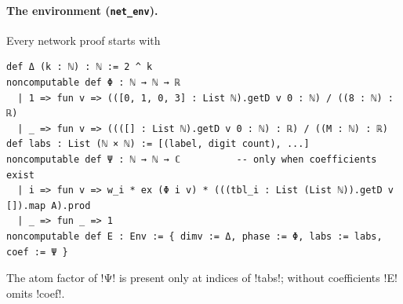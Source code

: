 {{{\paragraph{The environment (\texttt{net\_env}).} Every network proof starts with
\begin{lstlisting}[style=lexlean]
def Δ (k : ℕ) : ℕ := 2 ^ k
noncomputable def Φ : ℕ → ℕ → ℝ
  | 1 => fun v => (([0, 1, 0, 3] : List ℕ).getD v 0 : ℕ) / ((8 : ℕ) : ℝ)
  | _ => fun v => ((([] : List ℕ).getD v 0 : ℕ) : ℝ) / ((M : ℕ) : ℝ)
def labs : List (ℕ × ℕ) := [(label, digit count), ...]
noncomputable def Ψ : ℕ → ℕ → ℂ          -- only when coefficients exist
  | i => fun v => w_i * ex (Φ i v) * (((tbl_i : List (List ℕ)).getD v []).map A).prod
  | _ => fun _ => 1
noncomputable def E : Env := { dimv := Δ, phase := Φ, labs := labs, coef := Ψ }
\end{lstlisting}
The atom factor of \lexlean!Ψ! is present only at indices of \lexcode!tabs!; without coefficients
\lexlean!E! omits \lexlean!coef!.

}}}
